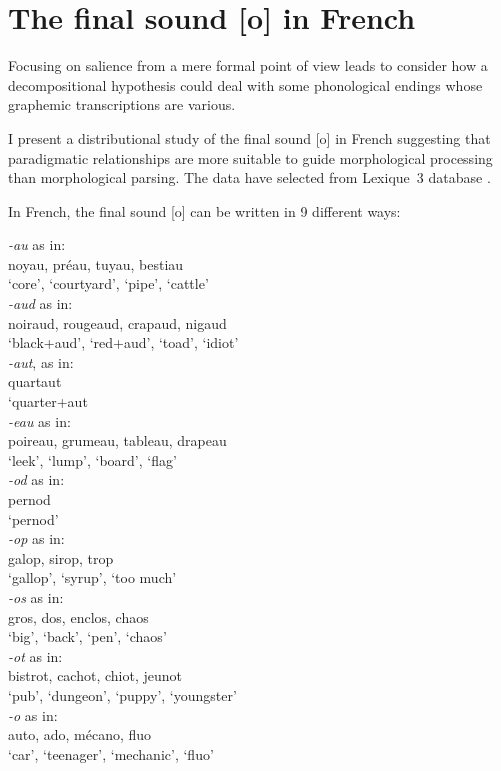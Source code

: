 \documentclass[output=paper]{langsci/langscibook}
\begin{document}
\section{The final sound {[}o{]} in
French}\label{the-final-sound-o-in-french}

Focusing on salience from a mere formal point of view leads to consider
how a decompositional hypothesis could deal with some phonological
endings whose graphemic transcriptions are various.

I present a distributional study of the final sound {[}o{]} in French
suggesting that paradigmatic relationships are more suitable to guide
morphological processing than morphological parsing. The data have
selected from Lexique~3 database %
\citep{new2006lexique}.

In French, the final sound {[}o{]} can be written in 9 different ways:

\ea   \emph{-au} as in:\\
  \gll noyau, préau, tuyau, bestiau\\
     `core', `courtyard', `pipe', `cattle'\\
\ex   \emph{-aud} as in:\\
  \gll noiraud, rougeaud, crapaud, nigaud\\
     `black+aud', `red+aud', `toad', `idiot'\\
\ex   \emph{-aut}, as in:\\
  \gll quartaut\\
     `quarter+aut\\
\ex   \emph{-eau} as in:\\
  \gll poireau, grumeau, tableau, drapeau\\
     `leek', `lump', `board', `flag'\\
\ex   \emph{-od} as in:\\
  \gll pernod\\
     `pernod'\\
\ex   \emph{-op} as in:\\
  \gll galop, sirop, trop\\
     `gallop', `syrup', `too much'\\
\ex   \emph{-os} as in:\\
  \gll gros, dos, enclos, chaos\\
     `big', `back', `pen', `chaos'\\
\newpage      
\ex   \emph{-ot} as in:\\
  \gll bistrot, cachot, chiot, jeunot\\
     `pub',  `dungeon', `puppy', `youngster'\\
\ex   \emph{-o} as in:\\
  \gll auto, ado, mécano, fluo\\
     `car', `teenager', `mechanic', `fluo'\\
\z
\end{document}
